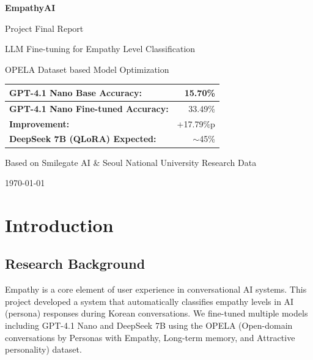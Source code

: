 \documentclass[11pt, a4paper]{article}
\begin{document}
\begin{titlepage}
    \centering
    \vspace*{2cm}
    {\Huge\bfseries\color{primary} EmpathyAI\par}
    \vspace{0.5cm}
    {\LARGE Project Final Report\par}
    \vspace{1cm}
    {\large LLM Fine-tuning for Empathy Level Classification\par}
    \vspace{0.3cm}
    {\large OPELA Dataset based Model Optimization\par}
    \vspace{2cm}
    
    \begin{tabular}{|l|r|}
    \hline
    \textbf{GPT-4.1 Nano Base Accuracy:} & 15.70\% \\
    \hline
    \textbf{GPT-4.1 Nano Fine-tuned Accuracy:} & 33.49\% \\
    \hline
    \textbf{Improvement:} & \textcolor{accent}{+17.79\%p} \\
    \hline
    \textbf{DeepSeek 7B (QLoRA) Expected:} & \textcolor{accent}{$\sim$45\%} \\
    \hline
    \end{tabular}
    
    \vspace{2cm}
    {\large Based on Smilegate AI \& Seoul National University Research Data\par}
    
    \vfill
    {\large \today\par}
\end{titlepage}

\tableofcontents
\newpage

\section{Introduction}

\subsection{Research Background}
Empathy is a core element of user experience in conversational AI systems. This project developed a system that automatically classifies empathy levels in AI (persona) responses during Korean conversations. We fine-tuned multiple models including GPT-4.1 Nano and DeepSeek 7B using the OPELA (Open-domain conversations by Personas with Empathy, Long-term memory, and Attractive personality) dataset.
\end{document}
